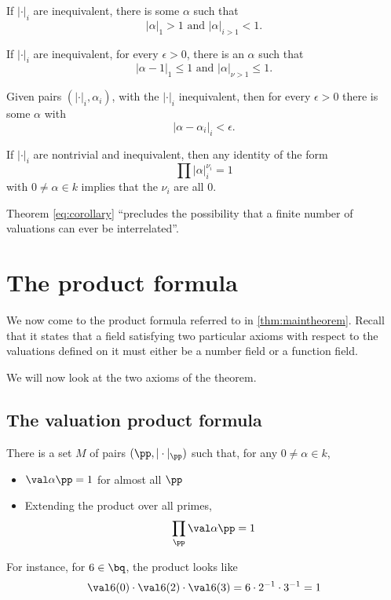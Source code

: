 \begin{lemma}
  If \(|\cdot|_i\) are inequivalent, there is some \(\alpha\) such
  that \[|\alpha|_1 > 1\text{ and }|\alpha|_{i>1} < 1.\]
\end{lemma}

\begin{lemma}
  If \(|\cdot|_i\) are inequivalent, for every \(\epsilon>0\), there is an
  \(\alpha\) such that \[|\alpha-1|_1 \leq 1 \text{ and } |\alpha|_{\nu>1}\leq
    1.\]
\end{lemma}

\begin{thm}
  \label{eq:approximation}
  Given pairs \((|\cdot|_i, \alpha_i)\), with the \(|\cdot|_i\) inequivalent,
  then for every \(\epsilon>0\) there is some \(\alpha\) with
  \[|\alpha - \alpha_i|_i < \epsilon.\]
\end{thm}

\begin{cor}
  \label{eq:corollary}
  If \(|\cdot|_i\) are nontrivial and inequivalent, then any identity of the
  form \[\prod |\alpha|_{i}^{\nu_i} = 1\] with \(0\neq \alpha\in k\) implies
  that the \(\nu_i\) are all \(0\).
\end{cor}

Theorem \ref{eq:corollary} ``precludes the possibility that a finite number of
valuations can ever be interrelated''.

\section{The product formula}
\label{sec:productformula}

We now come to the product formula referred to in \ref{thm:maintheorem}. Recall
that it states that a field satisfying two particular axioms with respect to the
valuations defined on it must either be a number field or a function field.

We will now look at the two axioms of the theorem.

\subsection{The valuation product formula}

\begin{axiom}
\label{eq:axiom1}
  There is a set \(M\) of pairs \((\pp, |\cdot|_\pp)\) such that, for any
  \(0\neq \alpha \in k\),
  \begin{itemize}
  \item \(\val\alpha\pp = 1\) for almost all \(\pp\)
  \item Extending the product over all primes,
    \[ \prod_\pp \val\alpha\pp = 1 \]
  \end{itemize}
  For instance, for \(6\in\bq\), the product looks like
  \[ \val6{(0)} \cdot\val6{(2)}\cdot\val6{(3)} = 6\cdot 2^{-1} \cdot 3^{-1} =
    1 \]
\end{axiom}

